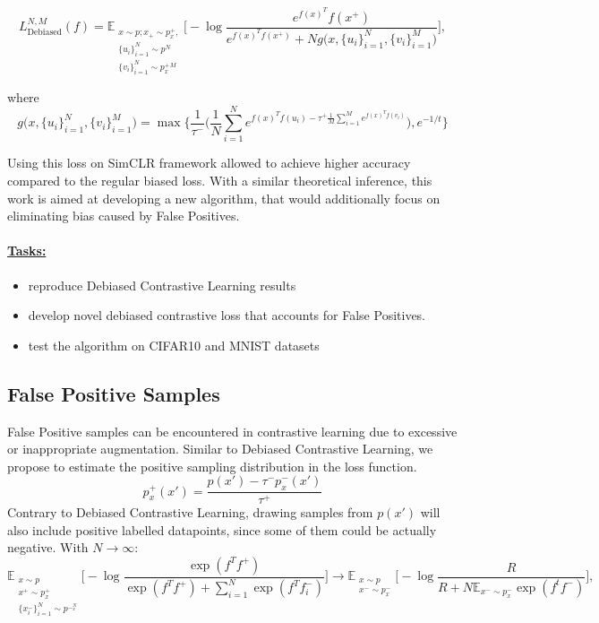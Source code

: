 \documentclass{article}
\begin{document}
\begin{equation} \label{eq:6}
L_{\text{Debiased}}^{N, M} (f) = \mathbb{E}_{\substack{x \sim p; x_+ \sim p_x^+,\\ \{u_i\}_{i=1}^N \sim p^N \\ \{v_i\}_{i=1}^N \sim p_x^+^M}}  \bigg[ -\log \frac{e^{f(x)^T} f(x^+)}{e^{f(x)^T f(x^+)} + N g\big(x, \{u_i\}_{i=1}^N, \{v_i\}_{i=1}^M\big)} \bigg],
\end{equation}

where
\begin{equation}
g\big(x, \{u_i\}_{i=1}^N, \{v_i\}_{i=1}^M\big) = \max \bigg\{ \frac{1}{\tau^-}\bigg(\frac{1}{N} \sum \limits_{i=1}^N e^{f(x)^T f(u_i) - \tau^+ \frac{1}{M} \sum \limits_{i=1}^M e^{f(x)^T f(v_i)}}\bigg), e^{-1/t}\bigg\}
\end{equation}

Using this loss on SimCLR framework allowed to achieve higher accuracy compared to the regular biased loss. With a similar theoretical inference, this work is aimed at developing a new algorithm, that would additionally focus on eliminating bias caused by False Positives.

\paragraph{\underline{Tasks:}} 
\begin{itemize}
  \item reproduce Debiased Contrastive Learning results
  \item develop novel debiased contrastive loss that accounts for False Positives.
  \item test the algorithm on CIFAR10 and MNIST datasets
\end{itemize}


\subsection{False Positive Samples}
False Positive samples can be encountered in contrastive learning due to excessive or inappropriate augmentation. Similar to Debiased Contrastive Learning, we propose to estimate the positive sampling distribution in the loss function.
\begin{equation}
p_x^+ (x') = \frac{p(x') - \tau^- p^-_x(x')}{\tau^+}
\end{equation}
Contrary to Debiased Contrastive Learning, drawing samples from $p(x')$ will also include positive labelled datapoints, since some of them could be actually negative. With $N \to \infty$:
\begin{equation}
\mathbb{E}_{\substack{x \sim p \\ x^+ \sim p_x^+ \\ \{x_i^-\}_{i=1}^N \sim p^-^N_x}} \bigg[ - \log \frac{\exp(f^T f^+)}{\exp(f^T f^+) + \sum_{i=1}^N \exp(f^T f_i^-)} \bigg] \longrightarrow \mathbb{E}_{\substack{x \sim p \\ x^- \sim p_x^-}} \bigg[ - \log \frac{R}{R + N \mathbb{E}_{x^- \sim p_x^-} \exp(f^t f^-)} \bigg],
\end{equation}
\end{document}
